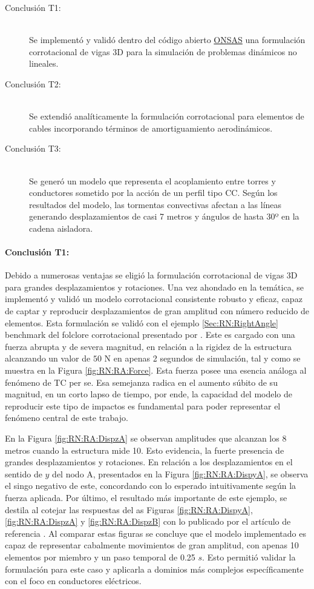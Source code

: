 \begin{description}
	\item[Conclusión T1:] \hfill \\ Se implementó y validó dentro del código abierto \href{https://github.com/ONSAS/ONSAS/}{ONSAS} una formulación corrotacional de vigas 3D para la simulación de problemas dinámicos no lineales.
	\item[Conclusión T2:] \hfill \\ Se extendió analíticamente la formulación corrotacional para elementos de cables incorporando términos de amortiguamiento aerodinámicos.
	\item[Conclusión T3:] \hfill \\ Se generó un modelo que representa el acoplamiento entre torres y conductores sometido por la acción de un perfil tipo CC. Según los resultados del modelo, las tormentas convectivas afectan a las líneas generando desplazamientos de casi 7 metros y ángulos de hasta 30º en la cadena aisladora. 
\end{description}

\paragraph*{Conclusión T1:}
Debido a numerosas ventajas se eligió la formulación corrotacional de vigas 3D para grandes desplazamientos y rotaciones. Una vez ahondado en la temática, se implementó y validó un modelo corrotacional consistente robusto y eficaz, capaz de captar y reproducir desplazamientos de gran amplitud con número reducido de elementos. Esta formulación se validó con el ejemplo \ref{Sec:RN:RightAngle} benchmark del folclore corrotacional presentado por \cite{simo1988dynamics}. Este es cargado con una fuerza abrupta y de severa magnitud, en relación a la rigidez de la estructura alcanzando un valor de $50$ N en apenas 2 segundos de simulación, tal y como se muestra en la Figura \ref{fig:RN:RA:Force}. Esta fuerza posee una esencia análoga al fenómeno de TC per se. Esa semejanza radica en el aumento súbito de su magnitud, en un corto lapso de tiempo, por ende, la capacidad del modelo de reproducir este tipo de impactos es fundamental para poder representar el fenómeno central de este trabajo.

En la Figura \ref{fig:RN:RA:DispzA} se observan amplitudes que alcanzan los 8 metros cuando la estructura mide 10. Esto evidencia, la fuerte presencia de grandes desplazamientos y rotaciones.  En relación a los desplazamientos en el sentido de $y$ del nodo A, presentados en la Figura \ref{fig:RN:RA:DispyA}, se observa el singo negativo de este, concordando con lo esperado intuitivamente según la fuerza aplicada. Por último, el resultado más importante de este ejemplo, se destila al cotejar las respuestas del as Figuras \ref{fig:RN:RA:DispyA}, \ref{fig:RN:RA:DispzA} y \ref{fig:RN:RA:DispzB} con lo publicado por el artículo de referencia \citep{Le2014}. Al comparar estas figuras se concluye que el modelo implementado es capaz de representar cabalmente movimientos de gran amplitud, con apenas 10 elementos por miembro y un paso temporal de 0.25 $s$. Esto permitió validar la formulación para este caso y aplicarla a dominios más complejos específicamente con el foco en conductores eléctricos. 

